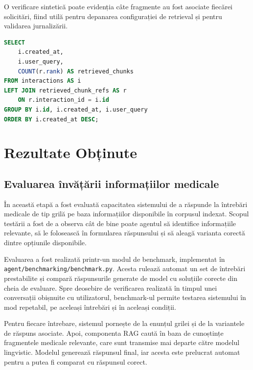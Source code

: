 \documentclass[12pt, a4paper, oneside, romanian]{teza-upb}
\begin{document}
O verificare sintetică poate evidenția câte fragmente au fost asociate fiecărei solicitări, fiind utilă pentru depanarea configurației de retrieval și pentru validarea jurnalizării.

\begin{center}
\begin{minipage}{0.68\textwidth}
\begin{lstlisting}[language=SQL, caption={Numărul fragmentelor recuperate pentru fiecare interacțiune}]
SELECT
    i.created_at,
    i.user_query,
    COUNT(r.rank) AS retrieved_chunks
FROM interactions AS i
LEFT JOIN retrieved_chunk_refs AS r
    ON r.interaction_id = i.id
GROUP BY i.id, i.created_at, i.user_query
ORDER BY i.created_at DESC;
\end{lstlisting}
\end{minipage}
\end{center}

\chapter{Rezultate Obținute}
\section{Evaluarea învățării informațiilor medicale}

În această etapă a fost evaluată capacitatea sistemului de a răspunde la întrebări medicale de tip grilă pe baza informațiilor disponibile în corpusul indexat. Scopul testării a fost de a observa cât de bine poate agentul să identifice informațiile relevante, să le folosească în formularea răspunsului și să aleagă varianta corectă dintre opțiunile disponibile.

Evaluarea a fost realizată printr-un modul de benchmark, implementat în \texttt{agent/benchmarking/benchmark.py}. Acesta rulează automat un set de întrebări prestabilite și compară răspunsurile generate de model cu soluțiile corecte din cheia de evaluare. Spre deosebire de verificarea realizată în timpul unei conversații obișnuite cu utilizatorul, benchmark-ul permite testarea sistemului în mod repetabil, pe aceleași întrebări și în aceleași condiții.

Pentru fiecare întrebare, sistemul pornește de la enunțul grilei și de la variantele de răspuns asociate. Apoi, componenta RAG caută în baza de cunoștințe fragmentele medicale relevante, care sunt transmise mai departe către modelul lingvistic. Modelul generează răspunsul final, iar acesta este prelucrat automat pentru a putea fi comparat cu răspunsul corect.
\end{document}
